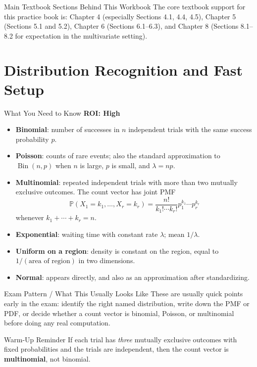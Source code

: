 \documentclass[12pt]{article}
\newcommand{\PP}{\mathbb{P}}
\newcommand{\Bin}{\operatorname{Bin}}
\newcommand{\roiline}[1]{\textbf{ROI: #1}}
\begin{document}
\begin{reviewbox}{Main Textbook Sections Behind This Workbook}
The core textbook support for this practice book is: Chapter 4 (especially Sections 4.1, 4.4, 4.5), Chapter 5 (Sections 5.1 and 5.2), Chapter 6 (Sections 6.1--6.3), and Chapter 8 (Sections 8.1--8.2 for expectation in the multivariate setting).
\end{reviewbox}

\clearpage

\section{Distribution Recognition and Fast Setup}

\begin{summarybox}{What You Need to Know}
\roiline{High}
\begin{itemize}
  \item \textbf{Binomial}: number of successes in $n$ independent trials with the same success probability $p$.
  \item \textbf{Poisson}: counts of rare events; also the standard approximation to $\Bin(n,p)$ when $n$ is large, $p$ is small, and $\lambda=np$.
  \item \textbf{Multinomial}: repeated independent trials with more than two mutually exclusive outcomes. The count vector has joint PMF
  \[
    \PP(X_1=k_1,\dots,X_r=k_r)=\frac{n!}{k_1!\cdots k_r!}p_1^{k_1}\cdots p_r^{k_r}
  \]
  whenever $k_1+\cdots+k_r=n$.
  \item \textbf{Exponential}: waiting time with constant rate $\lambda$; mean $1/\lambda$.
  \item \textbf{Uniform on a region}: density is constant on the region, equal to $1/(\text{area of region})$ in two dimensions.
  \item \textbf{Normal}: appears directly, and also as an approximation after standardizing.
\end{itemize}
\end{summarybox}

\begin{patternbox}{Exam Pattern / What This Usually Looks Like}
These are usually quick points early in the exam: identify the right named distribution, write down the PMF or PDF, or decide whether a count vector is binomial, Poisson, or multinomial before doing any real computation.
\end{patternbox}

\begin{examplebox}{Warm-Up Reminder}
If each trial has \emph{three} mutually exclusive outcomes with fixed probabilities and the trials are independent, then the count vector is \textbf{multinomial}, not binomial.
\end{examplebox}
\end{document}

